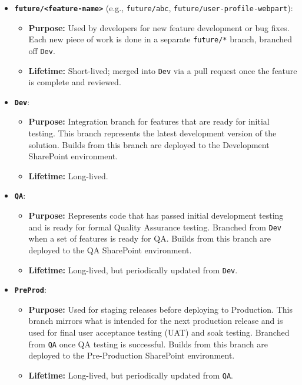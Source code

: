 \begin{itemize}
    \item \textbf{\texttt{future/<feature-name>}} (e.g., \texttt{future/abc}, \texttt{future/user-profile-webpart}):
    \begin{itemize}
        \item \textbf{Purpose:} Used by developers for new feature development or bug fixes. Each new piece of work is done in a separate \texttt{future/*} branch, branched off \texttt{Dev}.
        \item \textbf{Lifetime:} Short-lived; merged into \texttt{Dev} via a pull request once the feature is complete and reviewed.
    \end{itemize}
    \item \textbf{\texttt{Dev}}:
    \begin{itemize}
        \item \textbf{Purpose:} Integration branch for features that are ready for initial testing. This branch represents the latest development version of the solution. Builds from this branch are deployed to the Development SharePoint environment.
        \item \textbf{Lifetime:} Long-lived.
    \end{itemize}
    \item \textbf{\texttt{QA}}:
    \begin{itemize}
        \item \textbf{Purpose:} Represents code that has passed initial development testing and is ready for formal Quality Assurance testing. Branched from \texttt{Dev} when a set of features is ready for QA. Builds from this branch are deployed to the QA SharePoint environment.
        \item \textbf{Lifetime:} Long-lived, but periodically updated from \texttt{Dev}.
    \end{itemize}
    \item \textbf{\texttt{PreProd}}:
    \begin{itemize}
        \item \textbf{Purpose:} Used for staging releases before deploying to Production. This branch mirrors what is intended for the next production release and is used for final user acceptance testing (UAT) and soak testing. Branched from \texttt{QA} once QA testing is successful. Builds from this branch are deployed to the Pre-Production SharePoint environment.
        \item \textbf{Lifetime:} Long-lived, but periodically updated from \texttt{QA}.

\end{itemize}
\end{itemize}
